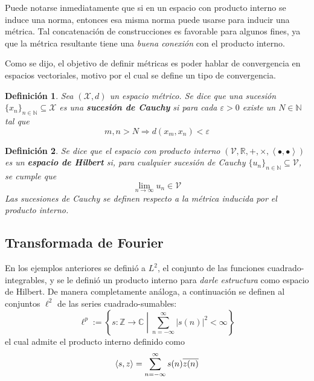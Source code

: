 \documentclass[12pt,letterpaper]{book}
\newtheorem{definicion}{Definición}[chapter]
\newcommand{\R}{\mathbb{R}}
\newcommand{\C}{\mathbb{C}}
\newcommand{\N}{\mathbb{N}}
\newcommand{\Z}{\mathbb{Z}}
\newcommand{\abso}[1]{\left| #1 \right|}
\newcommand{\producto}[1]{\left\langle #1 \right\rangle}
\newcommand{\talque}{\mathrel{}\middle|\mathrel{}}
\begin{document}
Puede notarse inmediatamente que si en un espacio con producto interno se induce una norma, entonces esa misma norma puede usarse para inducir una métrica.
%
Tal concatenación de construcciones es favorable para algunos fines, ya que la métrica resultante tiene una \textit{buena conexión} con el producto interno.

Como se dijo, el objetivo de definir métricas es poder hablar de convergencia en espacios vectoriales, motivo por el cual se define un tipo de convergencia.

\begin{definicion}
Sea $(\mathcal{X},d)$ un espacio métrico. Se dice que una sucesión $\{x_n\}_{n\in \N} \subseteq \mathcal{X}$ es una \textbf{sucesión de Cauchy} si para cada $\varepsilon > 0$ existe un $N \in \N$ tal que
\begin{equation}
m, n > N \Rightarrow d(x_m, x_n) < \varepsilon
\end{equation}
\end{definicion}

\begin{definicion}
Se dice que el espacio con producto interno $(\mathcal{V},\R,+,\times, \producto{\bullet,\bullet})$ es un \textbf{espacio de Hilbert} si, para cualquier sucesión de Cauchy $\{u_n\}_{n\in \N} \subseteq \mathcal{V}$, se cumple que
\begin{equation}
\lim_{n\rightarrow\infty} u_n \in \mathcal{V}
\end{equation}
Las sucesiones de Cauchy se definen respecto a la métrica inducida por el producto interno.
\end{definicion}


\subsection{Transformada de Fourier}
\label{sec:fourier1}

En los ejemplos anteriores se definió a $L^{2}$, el conjunto de las funciones cuadrado-integrables, y se le definió un producto interno para \textit{darle estructura} como espacio de Hilbert.
%
De manera completamente análoga, a continuación se definen al conjuntos $\ell^{2}$ de las series cuadrado-sumables:
\begin{equation}
\ell^{p} := \left\{ s: \Z\rightarrow\C \talque \sum_{n=-\infty}^{\infty} \abso{s(n)}^{2} < \infty \right\}
\end{equation}
el cual admite el producto interno definido como
\begin{equation}
\left\langle s,z \right\rangle = \sum_{n=-\infty}^{\infty} s(n) \overline{z(n)}\\
\end{equation}
\end{document}

